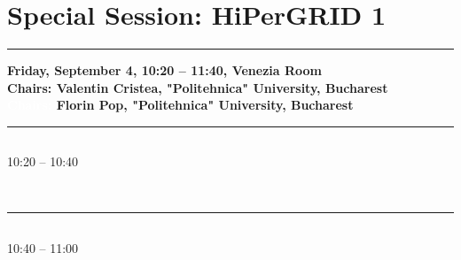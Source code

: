 \section{{\bf \large Special Session: %
HiPerGRID 1
}} \vspace{-15pt} %
\noindent\rule{\textwidth}{0.4pt} \nopagebreak
{\bf  
Friday, September 4, 10:20 -- 11:40, Venezia Room 
} \\ \nopagebreak
{\bf  Chairs: 
Valentin Cristea, "Politehnica" University, Bucharest
} \\ \nopagebreak 
{\bf  \textcolor{white}{Chairs:} 
Florin Pop, "Politehnica" University, Bucharest
} \\ \nopagebreak 
\noindent\rule{\textwidth}{0.4pt} \nopagebreak


\vspace*{-36pt}\subsection[ 
    	   {\bf Cost efficient cloud-based service oriented architecture for water pollution prediction
           } \\
           {\it Catalin Negru, Aurelian Draghia, Mariana Mocanu, Radu Drobot, Costin-Gabriel Chiru
           }
	]
	    {
            }
	    10:20 -- 10:40 \nopagebreak

            
            \\ 
            \noindent\rule{\textwidth}{0.4pt}
\vspace*{-36pt}\subsection[ 
    	   {\bf Cloud-based Service for Time Series Analysis and Visualisation in Farm Management System
           } \\
           {\it Valentina-Camelia Bojan, Ionut-Gabriel Raducu, Florin Pop, Mariana Mocanu, Valentin Cristea
           }
	]
	    {
            }
	    10:40 -- 11:00 \nopagebreak

